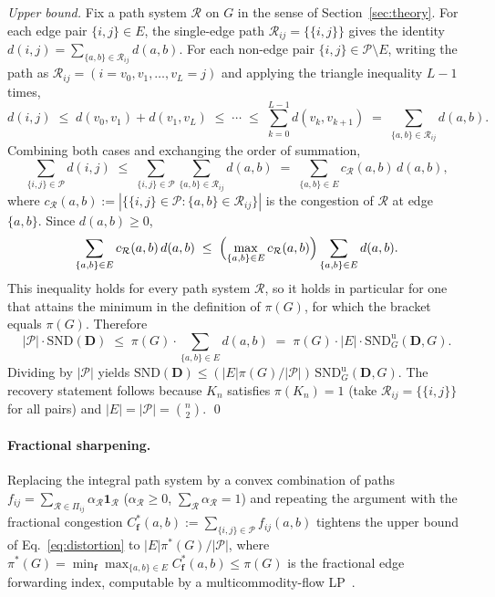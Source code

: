 \documentclass{article}
\theoremstyle{plain}
\theoremstyle{definition}
\theoremstyle{remark}
\newcommand{\Pairs}{\mathcal{P}}         %
\newcommand{\SND}{\ensuremath{\mathrm{SND}}}
\newcommand{\SNDG}{\mathrm{SND}_{G}}
\begin{document}
\emph{Upper bound.} Fix a path system $\mathcal{R}$ on $G$ in the sense
of Section~\ref{sec:theory}. For each edge pair $\{i,j\}\in E$, the
single-edge path $\mathcal{R}_{ij}=\{\{i,j\}\}$ gives the identity
$d(i,j)=\sum_{\{a,b\}\in\mathcal{R}_{ij}} d(a,b)$. For each non-edge
pair $\{i,j\}\in\Pairs\setminus E$, writing the path as
$\mathcal{R}_{ij}=(i=v_0,v_1,\dots,v_L=j)$ and applying the triangle
inequality $L-1$ times,
\[
d(i,j)\;\leq\; d(v_0,v_1)+d(v_1,v_L)\;\leq\;\cdots\;\leq\;
\sum_{k=0}^{L-1} d(v_k,v_{k+1})
\;=\; \sum_{\{a,b\}\in\mathcal{R}_{ij}} d(a,b).
\]
Combining both cases and exchanging the order of summation,
\[
\sum_{\{i,j\}\in\Pairs} d(i,j)
\;\leq\; \sum_{\{i,j\}\in\Pairs}\sum_{\{a,b\}\in\mathcal{R}_{ij}} d(a,b)
\;=\; \sum_{\{a,b\}\in E} c_{\mathcal{R}}(a,b)\,d(a,b),
\]
where
$c_{\mathcal{R}}(a,b):=|\{\{i,j\}\in\Pairs : \{a,b\}\in\mathcal{R}_{ij}\}|$
is the congestion of $\mathcal{R}$ at edge $\{a,b\}$. Since $d(a,b)\geq 0$,
\[
\sum_{\{a,b\}\in E} c_{\mathcal{R}}(a,b)\,d(a,b)
\;\leq\; \Bigl(\max_{\{a,b\}\in E} c_{\mathcal{R}}(a,b)\Bigr)
\sum_{\{a,b\}\in E} d(a,b).
\]
This inequality holds for every path system $\mathcal{R}$, so it holds
in particular for one that attains the minimum in the definition of
$\pi(G)$, for which the bracket equals $\pi(G)$. Therefore
\[
|\Pairs|\cdot\SND(\mathbf{D})
\;\leq\; \pi(G)\cdot\sum_{\{a,b\}\in E} d(a,b)
\;=\; \pi(G)\cdot |E|\cdot\SNDG^{\mathrm{u}}(\mathbf{D}, G).
\]
Dividing by $|\Pairs|$ yields
$\SND(\mathbf{D})\leq (|E|\pi(G)/|\Pairs|)\,\SNDG^{\mathrm{u}}(\mathbf{D},G)$.
The recovery statement follows because $K_n$ satisfies $\pi(K_n)=1$
(take $\mathcal{R}_{ij}=\{\{i,j\}\}$ for all pairs) and
$|E|=|\Pairs|=\binom{n}{2}$. \qed

\paragraph{Fractional sharpening.}
Replacing the integral path system by a convex combination of paths
$f_{ij}=\sum_{\mathcal{R}\in\Pi_{ij}}\alpha_{\mathcal{R}}\mathbf{1}_{\mathcal{R}}$
($\alpha_{\mathcal{R}}\geq 0$, $\sum_{\mathcal{R}}\alpha_{\mathcal{R}}=1$)
and repeating the argument with the fractional congestion
$C^{*}_{\mathbf{f}}(a,b):=\sum_{\{i,j\}\in\Pairs} f_{ij}(a,b)$ tightens
the upper bound of Eq.~\eqref{eq:distortion} to
$|E|\pi^{*}(G)/|\Pairs|$, where
$\pi^{*}(G)=\min_{\mathbf{f}}\max_{\{a,b\}\in E} C^{*}_{\mathbf{f}}(a,b)\leq\pi(G)$
is the fractional edge forwarding index, computable by a
multicommodity-flow LP~\citep{leighton1999multicommodity}.
\end{document}
